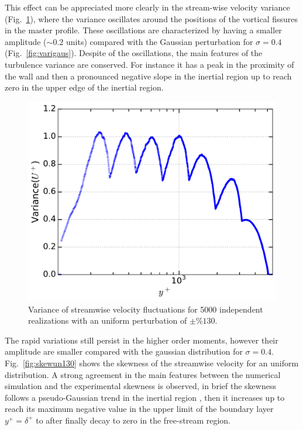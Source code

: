 \documentclass[aps,reprint,amsmath,amssymb,pra,floatfix]{revtex4-1}%
\begin{document}
This effect can be appreciated more clearly in the stream-wise velocity variance (Fig.~\ref{fig:varun130}), where the variance oscillates around the positions of the vortical fissures in the master profile. These oscillations are characterized by having a smaller amplitude ($\sim 0.2$ units) compared with the Gaussian perturbation for $\sigma=0.4$ (Fig.~\ref{fig:varigaus}). Despite of the oscillations, the main features of the turbulence variance are conserved. For instance it has a peak in the proximity of the wall and then a pronounced negative slope in the inertial region up to reach zero in the upper edge of the inertial region.\\
\begin{figure}[tbh]
\includegraphics[scale=0.46]{figures/variance_5000_assembles_un130}
\caption{\label{fig:varun130} Variance of streamwise velocity fluctuations for 5000 independent realizations with an uniform perturbation of $\pm \%130$.}
\end{figure}     
The rapid variations still persist in the higher order moments, however their amplitude are smaller compared with the gaussian distribution for $\sigma=0.4$. Fig.~\ref{fig:skewun130} shows the skewness of the streamwise velocity for an uniform distribution. A strong agreement in the main features between the numerical simulation and the experimental skewness is observed, in brief the skewness follows a pseudo-Gaussian trend in the inertial region , then it increases up to reach its maximum negative value in the upper limit of the boundary layer $y^+=\delta^+$ to after finally decay to zero in the free-stream region.
\end{document}
